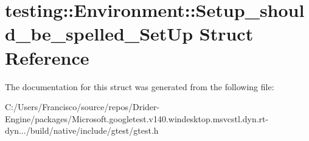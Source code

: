 \hypertarget{structtesting_1_1_environment_1_1_setup__should__be__spelled___set_up}{}\section{testing\+:\+:Environment\+:\+:Setup\+\_\+should\+\_\+be\+\_\+spelled\+\_\+\+Set\+Up Struct Reference}
\label{structtesting_1_1_environment_1_1_setup__should__be__spelled___set_up}


The documentation for this struct was generated from the following file\+:\begin{DoxyCompactItemize}
\item 
C\+:/\+Users/\+Francisco/source/repos/\+Drider-\/\+Engine/packages/\+Microsoft.\+googletest.\+v140.\+windesktop.\+msvcstl.\+dyn.\+rt-\/dyn.../build/native/include/gtest/gtest.\+h\end{DoxyCompactItemize}
